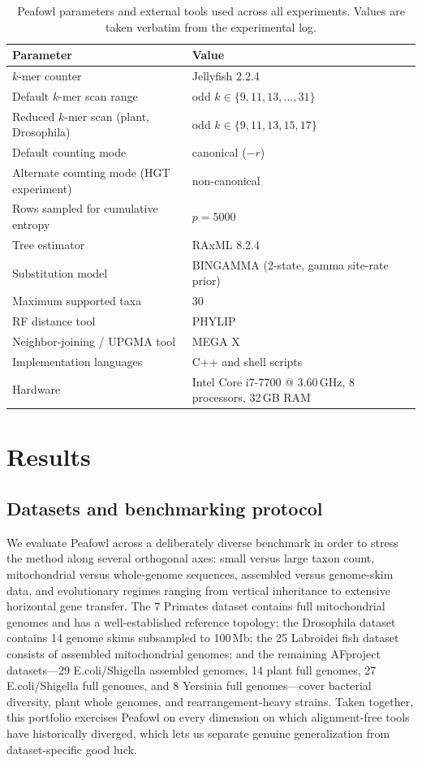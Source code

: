 \documentclass[11pt]{article}
\begin{document}
\begin{table}[htbp]
\centering
\caption{Peafowl parameters and external tools used across all experiments.
Values are taken verbatim from the experimental log.}
\label{tab:params}
\begin{tabular}{ll}
\toprule
Parameter & Value \\
\midrule
$k$-mer counter & Jellyfish 2.2.4 \citep{marcais2011jellyfish} \\
Default $k$-mer scan range & odd $k \in \{9, 11, 13, \ldots, 31\}$ \\
Reduced $k$-mer scan (plant, Drosophila) & odd $k \in \{9, 11, 13, 15, 17\}$ \\
Default counting mode & canonical ($-r$) \\
Alternate counting mode (HGT experiment) & non-canonical \\
Rows sampled for cumulative entropy & $p = 5000$ \\
Tree estimator & RAxML 8.2.4 \citep{stamatakis2014raxml} \\
Substitution model & BINGAMMA (2-state, gamma site-rate prior) \\
Maximum supported taxa & 30 \\
RF distance tool & PHYLIP \citep{felsenstein1989phylip} \\
Neighbor-joining / UPGMA tool & MEGA X \citep{kumar2018megax} \\
Implementation languages & C++ and shell scripts \\
Hardware & Intel Core i7-7700 @ 3.60\,GHz, 8 processors, 32\,GB RAM \\
\bottomrule
\end{tabular}
\end{table}

\section{Results}

\subsection{Datasets and benchmarking protocol}

We evaluate Peafowl across a deliberately diverse benchmark in order to
stress the method along several orthogonal axes: small versus large taxon
count, mitochondrial versus whole-genome sequences, assembled versus
genome-skim data, and evolutionary regimes ranging from vertical inheritance
to extensive horizontal gene transfer. The 7 Primates dataset contains full
mitochondrial genomes and has a well-established reference topology;
the Drosophila dataset contains 14 genome skims subsampled to 100\,Mb;
the 25 Labroidei fish dataset consists of assembled mitochondrial genomes;
and the remaining AFproject datasets---29 E.coli/Shigella assembled
genomes, 14 plant full genomes, 27 E.coli/Shigella full genomes, and 8
Yersinia full genomes---cover bacterial diversity, plant whole genomes,
and rearrangement-heavy strains. Taken together, this portfolio exercises
Peafowl on every dimension on which alignment-free tools have historically
diverged, which lets us separate genuine generalization from
dataset-specific good luck.
\end{document}
